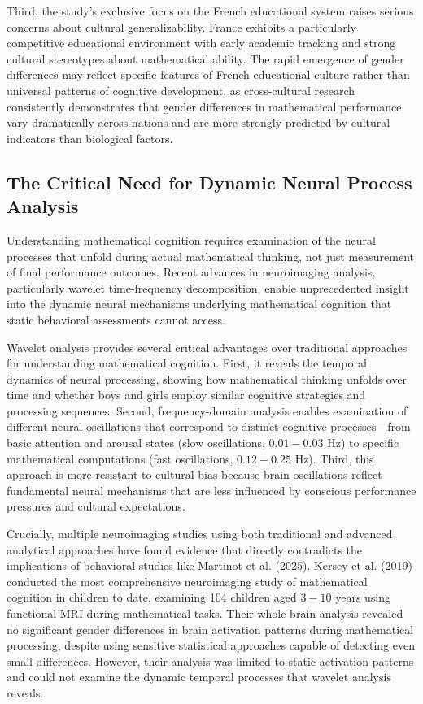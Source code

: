\documentclass[pdflatex,sn-nature]{sn-jnl}%
\theoremstyle{thmstyleone}%
\theoremstyle{thmstyletwo}%
\theoremstyle{thmstylethree}%
\begin{document}
Third, the study's exclusive focus on the French educational system raises serious concerns about cultural generalizability. France exhibits a particularly competitive educational environment with early academic tracking and strong cultural stereotypes about mathematical ability\cite{guiso2008culture}. The rapid emergence of gender differences may reflect specific features of French educational culture rather than universal patterns of cognitive development, as cross-cultural research consistently demonstrates that gender differences in mathematical performance vary dramatically across nations and are more strongly predicted by cultural indicators than biological factors\cite{else2010cross}.

\subsection{The Critical Need for Dynamic Neural Process Analysis}
Understanding mathematical cognition requires examination of the neural processes that unfold during actual mathematical thinking, not just measurement of final performance outcomes. Recent advances in neuroimaging analysis, particularly wavelet time-frequency decomposition\cite{torrence1998practical,cohen2014analyzing}, enable unprecedented insight into the dynamic neural mechanisms underlying mathematical cognition that static behavioral assessments cannot access.

Wavelet analysis provides several critical advantages over traditional approaches for understanding mathematical cognition. First, it reveals the temporal dynamics of neural processing, showing how mathematical thinking unfolds over time and whether boys and girls employ similar cognitive strategies and processing sequences. Second, frequency-domain analysis enables examination of different neural oscillations that correspond to distinct cognitive processes—from basic attention and arousal states (slow oscillations, $0.01-0.03$ Hz) to specific mathematical computations (fast oscillations, $0.12-0.25$ Hz). Third, this approach is more resistant to cultural bias because brain oscillations reflect fundamental neural mechanisms that are less influenced by conscious performance pressures and cultural expectations.

Crucially, multiple neuroimaging studies using both traditional and advanced analytical approaches have found evidence that directly contradicts the implications of behavioral studies like Martinot et al. (2025)\cite{martinot2025mathematical}. Kersey et al. (2019)\cite{kersey2019no} conducted the most comprehensive neuroimaging study of mathematical cognition in children to date, examining 104 children aged $3-10$ years using functional MRI during mathematical tasks. Their whole-brain analysis revealed no significant gender differences in brain activation patterns during mathematical processing, despite using sensitive statistical approaches capable of detecting even small differences. However, their analysis was limited to static activation patterns and could not examine the dynamic temporal processes that wavelet analysis reveals.
\end{document}
